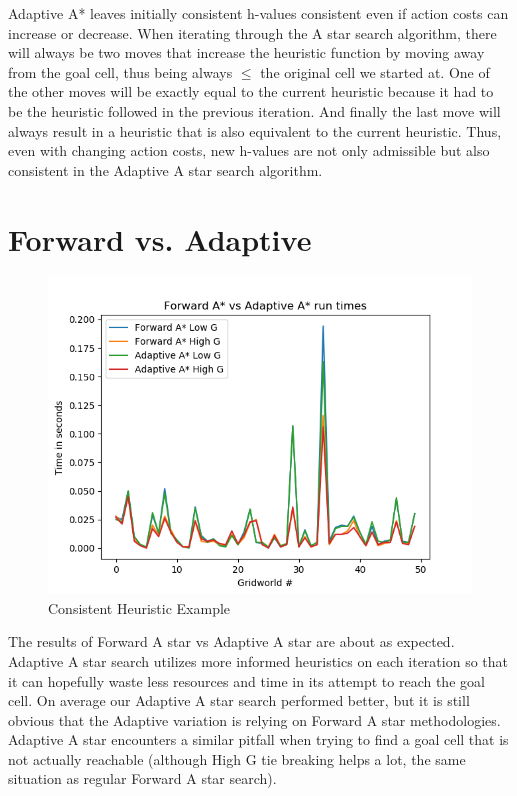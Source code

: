 \documentclass[12pt]{article}
\newcommand\tab[1][1cm]{\hspace*{#1}}
\begin{document}
\tab Adaptive A* leaves initially consistent h-values consistent even if action costs can increase or decrease. When iterating through the A star search algorithm, there will always be two moves that increase the heuristic function by moving away from the goal cell, thus being always $\leq$ the original cell we started at. One of the other moves will be exactly equal to the current heuristic because it had to be the heuristic followed in the previous iteration. And finally the last move will always result in a heuristic that is also equivalent to the current heuristic. Thus, even with changing action costs, new h-values are not only admissible but also consistent in the Adaptive A star search algorithm.

\newpage
\section*{Forward vs. Adaptive}
	\begin{figure}[!htb]
		\centering
		\includegraphics[width=.5\textwidth]{forward_vs_adaptive.png}
		\caption{\label{: }Consistent Heuristic Example}
	\end{figure} 
The results of Forward A star vs Adaptive A star are about as expected. Adaptive A star search utilizes more informed heuristics on each iteration so that it can hopefully waste less resources and time in its attempt to reach the goal cell. On average our Adaptive A star search performed better, but it is still obvious that the Adaptive variation is relying on Forward A star methodologies. Adaptive A star encounters a similar pitfall when trying to find a goal cell that is not actually reachable (although High G tie breaking helps a lot, the same situation as regular Forward A star search).
\newpage
\end{document}

